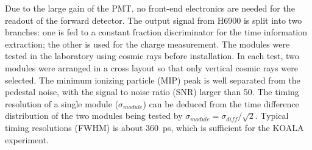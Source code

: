 \documentclass[number,5p]{elsarticle}
\begin{document}
Due to the large gain of the PMT, no front-end electronics are needed for the readout of the forward detector.
The output signal from H6900 is split into two branches: one is fed to a
constant fraction discriminator for the time information extraction; the other
is used for the charge measurement.
The modules were tested in the laboratory using cosmic rays before installation.
In each test, two modules were arranged in a cross layout so that only vertical
cosmic rays were selected.
The minimum ionizing particle (MIP) peak is well separated from the pedestal
noise, with the signal to noise ratio (SNR) larger than 50.
The timing resolution of a single module ($\sigma_{module}$) can be deduced from
the time difference distribution of the two modules being tested by $\sigma_{module}=\sigma_{diff}/\sqrt{2}$.
Typical timing resolutions (FWHM) is about \SI{360}{\pico\second}, which is
sufficient for the KOALA experiment.
\end{document}
